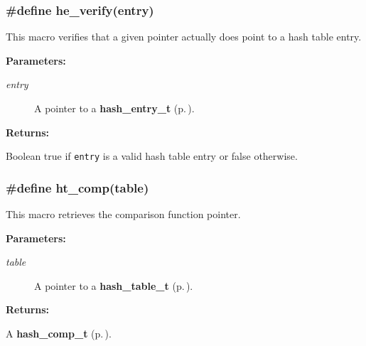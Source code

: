 \subsubsection{\setlength{\rightskip}{0pt plus 5cm}\#define he\_\-verify(entry)}\label{group__dbprim__hash_a30}




 This macro verifies that a given pointer actually does point to a hash table entry.\begin{Desc}
\item[{\bf Parameters: }]\par
\begin{description}
\item[
{\em entry}]A pointer to a {\bf hash\_\-entry\_\-t} {\rm (p.\,\pageref{group__dbprim__hash_a1})}.

\end{description}
\end{Desc}
\begin{Desc}
\item[{\bf Returns: }]\par
Boolean true if {\tt entry} is a valid hash table entry or false otherwise. \end{Desc}
\subsubsection{\setlength{\rightskip}{0pt plus 5cm}\#define ht\_\-comp(table)}\label{group__dbprim__hash_a25}




 This macro retrieves the comparison function pointer.\begin{Desc}
\item[{\bf Parameters: }]\par
\begin{description}
\item[
{\em table}]A pointer to a {\bf hash\_\-table\_\-t} {\rm (p.\,\pageref{group__dbprim__hash_a0})}.

\end{description}
\end{Desc}
\begin{Desc}
\item[{\bf Returns: }]\par
A {\bf hash\_\-comp\_\-t} {\rm (p.\,\pageref{group__dbprim__hash_a4})}. \end{Desc}
